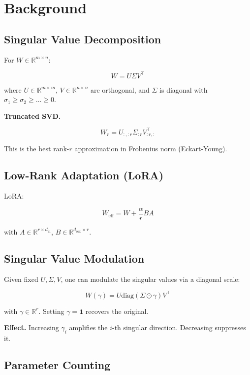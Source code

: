 
\section{Background}

\subsection{Singular Value Decomposition}

For $W \in \mathbb{R}^{m \times n}$:

\[
W = U \Sigma V^\top
\tag{3.1}
\]

where $U \in \mathbb{R}^{m \times m}$, $V \in \mathbb{R}^{n \times n}$ are 
orthogonal, and $\Sigma$ is diagonal with $\sigma_1 \geq \sigma_2 \geq \dots \geq 0$.

\textbf{Truncated SVD.}

\[
W_r = U_{:, :r} \Sigma_{:r} V_{:r, :}^\top
\tag{3.2}
\]

This is the best rank-$r$ approximation in Frobenius norm (Eckart-Young).

\subsection{Low-Rank Adaptation (LoRA)}

LoRA:

\[
W_\text{eff} = W + \frac{\alpha}{r} BA
\tag{3.3}
\]

with $A \in \mathbb{R}^{r \times d_\text{in}}$, $B \in \mathbb{R}^{d_\text{out} \times r}$.

\subsection{Singular Value Modulation}

Given fixed $U, \Sigma, V$, one can modulate the singular values via a 
diagonal scale:

\[
W(\gamma) = U \text{diag}(\Sigma \odot \gamma) V^\top
\tag{3.4}
\]

with $\gamma \in \mathbb{R}^r$. Setting $\gamma = \mathbf{1}$ recovers the 
original.

\textbf{Effect.} Increasing $\gamma_i$ amplifies the $i$-th singular direction. 
Decreasing suppresses it.

\subsection{Parameter Counting}

